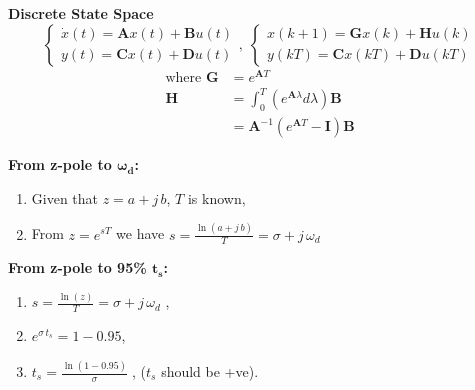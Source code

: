 \textbf{\large Discrete State Space}
\begin{equation*}
    \begin{cases}
     \dot{x}(t) = \bm{A}x(t) + \bm{B}u(t) \\
     y(t) = \bm{C}x(t)+\bm{D} u(t)
    \end{cases}, \; \begin{cases}
     x(k+1) = \bm{G}x(k) + \bm{H}u(k) \\
     y(kT) = \bm{C}x(kT) + \bm{D}u(kT)
    \end{cases}
\end{equation*}
\begin{align*}
    \text{where } \bm{G} &= e^{\bm{A}T} \\
    \bm{H} &= \int_{0}^{T}\left(e^{\bm{A}\lambda} d\lambda\right) \bm{B} \\
    &= \bm{A}^{-1} (e^{\bm{A}T}- \bm{I})\bm{B}
\end{align*}

\textbf{From z-pole to $\bm{\omega_d}$:}

\begin{enumerate}
    \item Given that $z=a+j\, b$, $T$ is known,
    \item From $z=e^{sT}$ we have $s=\frac{\ln(a+j\, b)}{T}=\sigma + j\, \omega_d$
\end{enumerate}

\textbf{From z-pole to 95\% $\bm{t_s}$:}
\begin{enumerate}
    \item $s = \frac{\ln(z)}{T} = \sigma + j\,\omega_d$ ,
    \item $e^{\sigma \, t_s} = 1 - 0.95$,
    \item $t_s = \frac{\ln(1-0.95)}{\sigma}\;$, ($t_s$ should be +ve).
\end{enumerate}